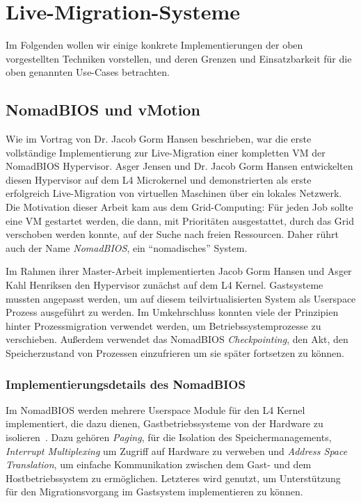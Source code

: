 \section{Live-Migration-Systeme}
\label{sec:live-migr-syst}
Im Folgenden wollen wir einige konkrete Implementierungen der oben
vorgestellten Techniken vorstellen, und deren Grenzen und
Einsatzbarkeit für die oben genannten Use-Cases betrachten.

\subsection{NomadBIOS und vMotion}
\label{sec:nomadbios--vmware}
Wie im Vortrag von Dr. Jacob Gorm Hansen beschrieben, war die erste
vollständige Implementierung zur Live-Migration einer kompletten \ac{VM}
der NomadBIOS Hypervisor. Asger Jensen und Dr. Jacob Gorm Hansen
entwickelten diesen Hypervisor auf dem L4 Microkernel und
demonstrierten als erste erfolgreich Live-Migration von virtuellen
Maschinen über ein lokales Netzwerk. Die Motivation dieser Arbeit kam
aus dem Grid-Computing: Für jeden Job sollte eine \ac{VM} gestartet werden,
die dann, mit Prioritäten ausgestattet, durch das Grid verschoben
werden konnte, auf der Suche nach freien Ressourcen. Daher rührt auch
der Name \emph{NomadBIOS}, ein "`nomadisches"' System.

Im Rahmen ihrer Master-Arbeit implementierten Jacob Gorm Hansen und
Asger Kahl Henriksen den Hypervisor zunächst auf dem L4
Kernel. Gastsysteme mussten angepasst werden, um auf diesem
teilvirtualisierten System als Userspace Prozess ausgeführt zu
werden. Im Umkehrschluss konnten viele der Prinzipien hinter
Prozessmigration verwendet werden, um Betriebssystemprozesse zu
verschieben. Außerdem verwendet das NomadBIOS \emph{Checkpointing},
den Akt, den Speicherzustand von Prozessen einzufrieren um sie später
fortsetzen zu können.

\subsubsection{Implementierungsdetails des NomadBIOS}
\label{sec:impl-des-nomadb}
Im NomadBIOS werden mehrere Userspace Module für den L4 Kernel
implementiert, die dazu dienen, Gastbetriebssysteme von der Hardware
zu isolieren~\cite{hansen2002nomadic}. Dazu gehören \emph{Paging}, für
die Isolation des Speichermanagements, \emph{Interrupt Multiplexing}
um Zugriff auf Hardware zu verweben und \emph{Address Space
  Translation}, um einfache Kommunikation zwischen dem Gast- und dem
Hostbetriebssystem zu ermöglichen. Letzteres wird genutzt, um
Unterstützung für den Migrationsvorgang im Gastsystem implementieren
zu können.


